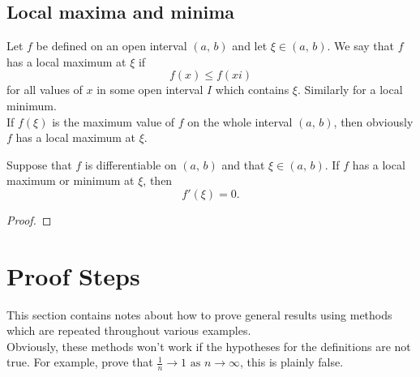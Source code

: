 \documentclass[10pt, a4paper]{article}
\newcommand{\limas}[3][n]{#2 \rightarrow #3 \text{ as } #1 \rightarrow \infty}
\begin{document}
\subsection{Local maxima and minima}
Let $f$ be defined on an open interval $(a,\,b)$ and let $\xi \in (a,\,b)$. We say that $f$ has a local maximum at $\xi$ if
\[
f(x) \leq f(xi)
\]
for all values of $x$ in some open interval $I$ which contains $\xi$. Similarly for a local minimum. \\
If $f(\xi)$ is the maximum value of $f$ on the whole interval $(a,\,b)$, then obviously $f$ has a local maximum at $\xi$.

\begin{theorem}
    Suppose that $f$ is differentiable on $(a,\,b)$ and that $\xi \in (a,\,b)$. If $f$ has a local maximum or minimum at $\xi$, then
    \[
    f'(\xi) = 0.
    \]
    \begin{proof}
        
    \end{proof}
\end{theorem}

\newpage

\section{Proof Steps}
This section contains notes about how to prove general results using methods which are repeated throughout various examples.
\\
Obviously, these methods won't work if the hypotheses for the definitions are not true. For example, prove that $\limas{\frac{1}{n}}{1}$, this is plainly false.
\end{document}
